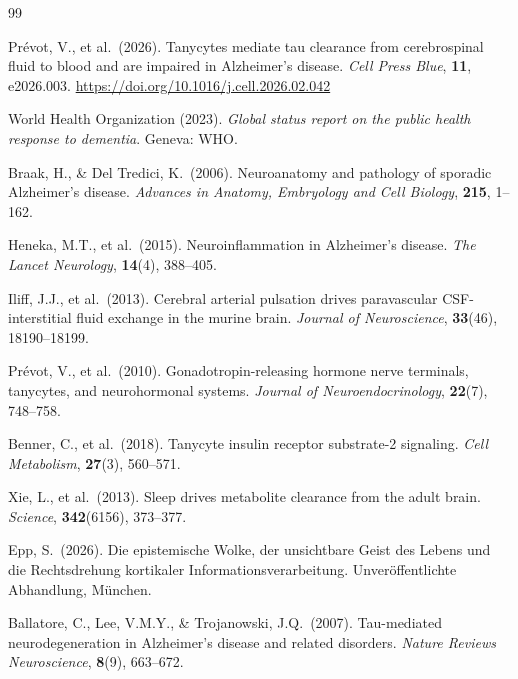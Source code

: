﻿\documentclass[12pt,a4paper]{article}
\theoremstyle{definition}
\begin{document}
	\begin{thebibliography}{99}
		
		Prévot, V., et al.\ (2026). Tanycytes mediate tau clearance from cerebrospinal fluid to blood and are impaired in Alzheimer's disease. \textit{Cell Press Blue}, \textbf{11}, e2026.003. \url{https://doi.org/10.1016/j.cell.2026.02.042}
		
		World Health Organization (2023). \textit{Global status report on the public health response to dementia}. Geneva: WHO.
		
		Braak, H., \& Del Tredici, K.\ (2006). Neuroanatomy and pathology of sporadic Alzheimer's disease. \textit{Advances in Anatomy, Embryology and Cell Biology}, \textbf{215}, 1--162.
		
		Heneka, M.T., et al.\ (2015). Neuroinflammation in Alzheimer's disease. \textit{The Lancet Neurology}, \textbf{14}(4), 388--405.
		
		Iliff, J.J., et al.\ (2013). Cerebral arterial pulsation drives paravascular CSF-interstitial fluid exchange in the murine brain. \textit{Journal of Neuroscience}, \textbf{33}(46), 18190--18199.
		
		Prévot, V., et al.\ (2010). Gonadotropin-releasing hormone nerve terminals, tanycytes, and neurohormonal systems. \textit{Journal of Neuroendocrinology}, \textbf{22}(7), 748--758.
		
		Benner, C., et al.\ (2018). Tanycyte insulin receptor substrate-2 signaling. \textit{Cell Metabolism}, \textbf{27}(3), 560--571.
		
		Xie, L., et al.\ (2013). Sleep drives metabolite clearance from the adult brain. \textit{Science}, \textbf{342}(6156), 373--377.
		
		Epp, S.\ (2026). Die epistemische Wolke, der unsichtbare Geist des Lebens und die Rechtsdrehung kortikaler Informationsverarbeitung. Unver\"offentlichte Abhandlung, M\"unchen.

		Ballatore, C., Lee, V.M.Y., \& Trojanowski, J.Q.\ (2007). Tau-mediated neurodegeneration in Alzheimer's disease and related disorders. \textit{Nature Reviews Neuroscience}, \textbf{8}(9), 663--672.
		

\end{thebibliography}
\end{document}
